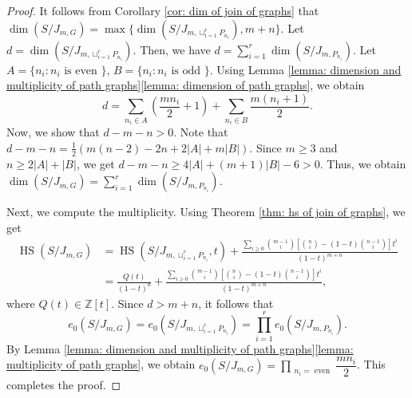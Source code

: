 \documentclass[10pt,a4paper]{amsart}
\newcommand \hs{\operatorname{HS}}
\begin{document}
\begin{proof}
It follows from Corollary \ref{cor: dim of join of graphs} that $\dim(S/J_{m,G})=\max\{\dim(S/J_{m,\sqcup_{i=1}^rP_{n_i}}),m+n\}$. Let $d=\dim(S/J_{m,\sqcup_{i=1}^rP_{n_i}})$. Then, we have $d=\sum_{i=1}^r\dim(S/J_{m,P_{n_i}})$.
Let $A=\{n_i:n_i\text{ is even }\}$, $B=\{n_i:n_i\text{ is odd }\}$. Using Lemma \ref{lemma: dimension and multiplicity of path graphs}\eqref{lemma: dimension of path graphs}, we obtain $$d=\sum_{n_i\in A}(\frac{mn_i}{2}+1)+\sum_{n_i\in B}\frac{m(n_i+1)}{2}.$$ Now, we show that $d-m-n>0$. Note that $d-m-n=\frac{1}{2}(m(n-2)-2n+2|A|+m|B|)$. Since $m\geq 3$ and $n\geq 2|A|+|B|$, we get $d-m-n\geq 4|A|+(m+1)|B|-6>0$. Thus, we obtain $\dim(S/J_{m,G})=\sum_{i=1}^r\dim(S/J_{m,P_{n_i}})$. 

Next, we compute the multiplicity. Using Theorem \ref{thm: hs of join of graphs}, we get
   \begin{align*}
      \hs(S/J_{m,G})&=\hs(S/J_{m,\sqcup_{i=1}^rP_{n_i}},t)+\frac{\sum_{i\geq 0}\binom{m-1}{i}\left[\binom{n}{i}-(1-t)\binom{n-1}{i}\right]t^i}{(1-t)^{m+n}}\\
      &=\frac{Q(t)}{(1-t)^{d}}+\frac{\sum_{i\geq 0}\binom{m-1}{i}\left[\binom{n}{i}-(1-t)\binom{n-1}{i}\right]t^i}{(1-t)^{m+n}},
   \end{align*}
    where $Q(t)\in \mathbb Z[t]$. Since $d>m+n$, it follows that  $$e_0(S/J_{m,G})=e_0(S/J_{m,\sqcup_{i=1}^rP_{n_i}})=\prod_{i=1}^r e_0(S/J_{m,P_{n_i}}).$$ By Lemma \ref{lemma: dimension and multiplicity of path graphs}\eqref{lemma: multiplicity of path graphs}, we obtain $e_0(S/J_{m,G})=\prod_{\substack{n_i=\text{ even}}} \dfrac{mn_i}{2}$. This completes the proof.  
\end{proof}
\end{document}
